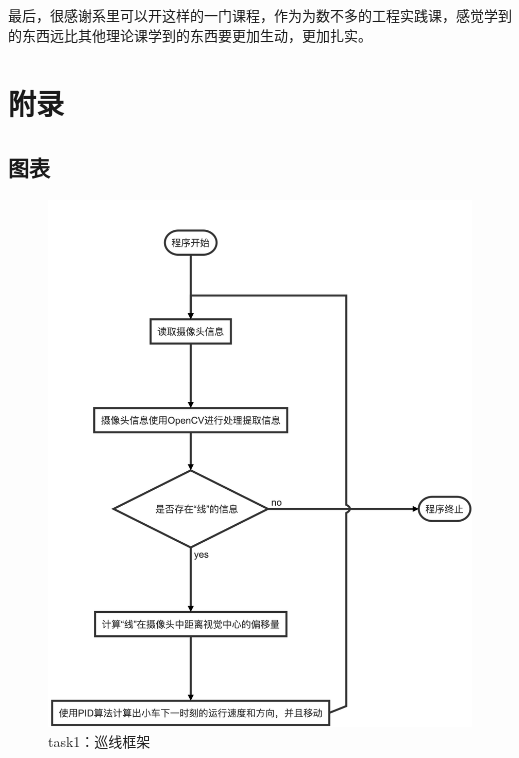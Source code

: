 \documentclass[a4paper,twoside]{article}
\begin{document}
最后，很感谢系里可以开这样的一门课程，作为为数不多的工程实践课，感觉学到的东西远比其他理论课学到的东西要更加生动，更加扎实。

\newpage
\appendix
\section{附录}
\subsection{图表}
\begin{figure}[htbp]
	\begin{center}
		\includegraphics[width=14.5cm]{task1framework.png}
		\caption{task1：巡线框架}
		\label{task1frame}
	\end{center}
\end{figure}
\end{document}
